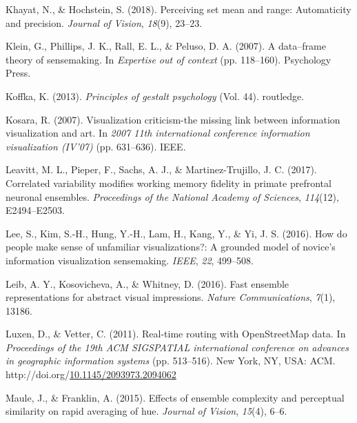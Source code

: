 \documentclass[print]{nuthesis}
\newlength{\cslhangindent}
\newenvironment{CSLReferences}[2]%
{\setlength{\parindent}{0pt}%
\everypar{\setlength{\hangindent}{\cslhangindent}}\ignorespaces}%
{\par}
\begin{document}
\begin{CSLReferences}{1}{0}
\leavevmode{}%
Khayat, N., \& Hochstein, S. (2018). Perceiving set mean and range: Automaticity and precision. \emph{Journal of Vision}, \emph{18}(9), 23--23.

\leavevmode{}%
Klein, G., Phillips, J. K., Rall, E. L., \& Peluso, D. A. (2007). A data--frame theory of sensemaking. In \emph{Expertise out of context} (pp. 118--160). Psychology Press.

\leavevmode{}%
Koffka, K. (2013). \emph{Principles of gestalt psychology} (Vol. 44). routledge.

\leavevmode{}%
Kosara, R. (2007). Visualization criticism-the missing link between information visualization and art. In \emph{2007 11th international conference information visualization (IV'07)} (pp. 631--636). IEEE.

\leavevmode{}%
Leavitt, M. L., Pieper, F., Sachs, A. J., \& Martinez-Trujillo, J. C. (2017). Correlated variability modifies working memory fidelity in primate prefrontal neuronal ensembles. \emph{Proceedings of the National Academy of Sciences}, \emph{114}(12), E2494--E2503.

\leavevmode{}%
Lee, S., Kim, S.-H., Hung, Y.-H., Lam, H., Kang, Y., \& Yi, J. S. (2016). How do people make sense of unfamiliar visualizations?: A grounded model of novice's information visualization sensemaking. \emph{IEEE}, \emph{22}, 499--508.

\leavevmode{}%
Leib, A. Y., Kosovicheva, A., \& Whitney, D. (2016). Fast ensemble representations for abstract visual impressions. \emph{Nature Communications}, \emph{7}(1), 13186.

\leavevmode{}%
Luxen, D., \& Vetter, C. (2011). Real-time routing with OpenStreetMap data. In \emph{Proceedings of the 19th ACM SIGSPATIAL international conference on advances in geographic information systems} (pp. 513--516). New York, NY, USA: ACM. http://doi.org/\href{https://doi.org/10.1145/2093973.2094062}{10.1145/2093973.2094062}

\leavevmode{}%
Maule, J., \& Franklin, A. (2015). Effects of ensemble complexity and perceptual similarity on rapid averaging of hue. \emph{Journal of Vision}, \emph{15}(4), 6--6.


\end{CSLReferences}
\end{document}
